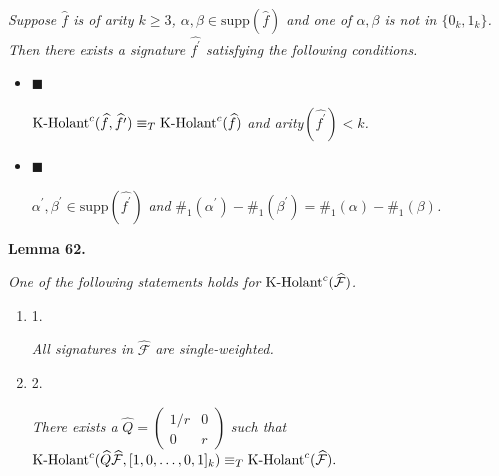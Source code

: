 \documentclass[10pt,a4paper]{article}
\begin{document}
\emph{Suppose $\widehat{f}$ is of arity $k\geq 3$, $\alpha,\beta\in\text{supp}(\widehat{f})$ and one of $\alpha,\beta$ is not in $\{0_{k},1_{k}\}$. Then there exists a signature $\widehat{f^{\prime}}$ satisfying the following conditions.}\par


\begin{itemize}


\item[] 
$\blacksquare$ 


$\textup{{K-Holant}}^{c}(\widehat{f},\widehat{f^{\prime}})\equiv_{T}\textup{{K-Holant}}^{c}(\widehat{f})$\emph{ and arity}$(\widehat{f^{\prime}})<k$\emph{.}\par





\item[] 
$\blacksquare$ 


$\alpha^{\prime},\beta^{\prime}\in\text{supp}(\widehat{f^{\prime}})$\emph{ and }$\#_{1}(\alpha^{\prime})-\#_{1}(\beta^{\prime})=\#_{1}(\alpha)-\#_{1}(\beta)$\emph{.}\par





\end{itemize}







\par\medskip\noindent\textbf{
\textbf{Lemma 62}\textbf{.}
}\par



\emph{One of the following statements holds for $\textup{{K-Holant}}^{c}(\widehat{\mathcal{F}})$.}\par


\begin{enumerate}


\item[] 
1. 


\emph{All signatures in }$\widehat{\mathcal{F}}$\emph{ are single-weighted.}\par





\item[] 
2. 


\emph{There exists a }$\widehat{Q}=\begin{pmatrix}1/r&0\\
0&r\end{pmatrix}$\emph{ such that }$\textup{{K-Holant}}^{c}(\widehat{Q}\widehat{\mathcal{F}},[1,0,\dots,0,1]_{k})\equiv_{T}\textup{{K-Holant}}^{c}(\widehat{\mathcal{F}}).$\emph{}\par





\end{enumerate}
\end{document}
